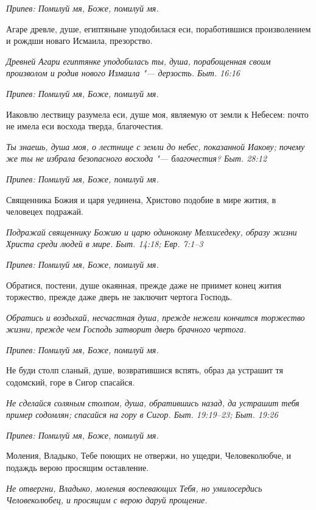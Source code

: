 \itshape Припев:\normalfont{} Помилуй мя, Боже, помилуй мя.


Агаре древле, душе, египтяныне уподобилася еси, поработившися произволением и рождши новаго Исмаила, презорство.


\itshape Древней Агари египтянке уподобилась ты, душа, порабощенная своим произволом и родив нового Измаила "--- дерзость. Быт. 16:16\normalfont{}


\itshape Припев:\normalfont{} Помилуй мя, Боже, помилуй мя.


Иаковлю лествицу разумела еси, душе моя, являемую от земли к Небесем: почто не имела еси восхода тверда, благочестия.


\itshape Ты знаешь, душа моя, о лестнице с земли до небес, показанной Иакову; почему же ты не избрала безопасного восхода "--- благочестия? Быт. 28:12\normalfont{}


\itshape Припев:\normalfont{} Помилуй мя, Боже, помилуй мя.


Священника Божия и царя уединена, Христово подобие в мире жития, в человецех подражай.


\itshape Подражай священнику Божию и царю одинокому Мелхиседеку, образу жизни Христа среди людей в мире. Быт. 14:18; Евр. 7:1–3\normalfont{}


\itshape Припев:\normalfont{} Помилуй мя, Боже, помилуй мя.


Обратися, постени, душе окаянная, прежде даже не приимет конец жития торжество, прежде даже дверь не заключит чертога Господь.


\itshape Обратись и воздыхай, несчастная душа, прежде нежели кончится торжество жизни, прежде чем Господь затворит дверь брачного чертога.\normalfont{}


\itshape Припев:\normalfont{} Помилуй мя, Боже, помилуй мя.


Не буди столп сланый, душе, возвратившися вспять, образ да устрашит тя содомский, горе в Сигор спасайся.


\itshape Не сделайся соляным столпом, душа, обратившись назад, да устрашит тебя пример содомлян; спасайся на гору в Сигор. Быт. 19:19–23; Быт. 19:26\normalfont{}


\itshape Припев:\normalfont{} Помилуй мя, Боже, помилуй мя.


Моления, Владыко, Тебе поющих не отвержи, но ущедри, Человеколюбче, и подаждь верою просящим оставление.


\itshape Не отвергни, Владыко, моления воспевающих Тебя, но умилосердись Человеколюбец, и просящим с верою даруй прощение.\normalfont{}


